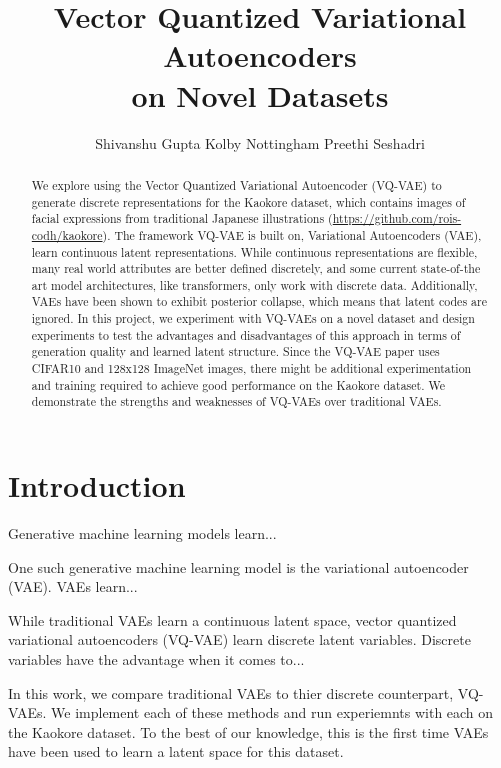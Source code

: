 \documentclass{article}
\title{Vector Quantized Variational Autoencoders \\on Novel Datasets}
\author{
  Shivanshu Gupta
  \And
  Kolby Nottingham
  \And
  Preethi Seshadri
}
\begin{document}
\maketitle

\begin{abstract}
    We explore using the Vector Quantized Variational Autoencoder (VQ-VAE) to generate discrete representations for the Kaokore dataset, which contains images of facial expressions from traditional Japanese illustrations (\url{https://github.com/rois-codh/kaokore}).
    The framework VQ-VAE is built on, Variational Autoencoders (VAE), learn continuous latent representations.
    While continuous representations are flexible, many real world attributes are better defined discretely, and some current state-of-the art model architectures, like transformers, only work with discrete data. Additionally, VAEs have been shown to exhibit posterior collapse, which means that latent codes are ignored. 
    In this project, we experiment with VQ-VAEs on a novel dataset and design experiments to test the advantages and disadvantages of this approach in terms of generation quality and learned latent structure.
    Since the VQ-VAE paper uses CIFAR10 and 128x128 ImageNet images, there might be additional experimentation and training required to achieve good performance on the Kaokore dataset.
    We demonstrate the strengths and weaknesses of VQ-VAEs over traditional VAEs. 
\end{abstract}

\section{Introduction}

Generative machine learning models learn...

One such generative machine learning model is the variational autoencoder (VAE). VAEs learn...

While traditional VAEs learn a continuous latent space, vector quantized variational autoencoders (VQ-VAE) learn discrete latent variables. Discrete variables have the advantage when it comes to...

In this work, we compare traditional VAEs to thier discrete counterpart, VQ-VAEs. We implement each of these methods and run experiemnts with each on the Kaokore dataset. To the best of our knowledge, this is the first time VAEs have been used to learn a latent space for this dataset.
\end{document}
